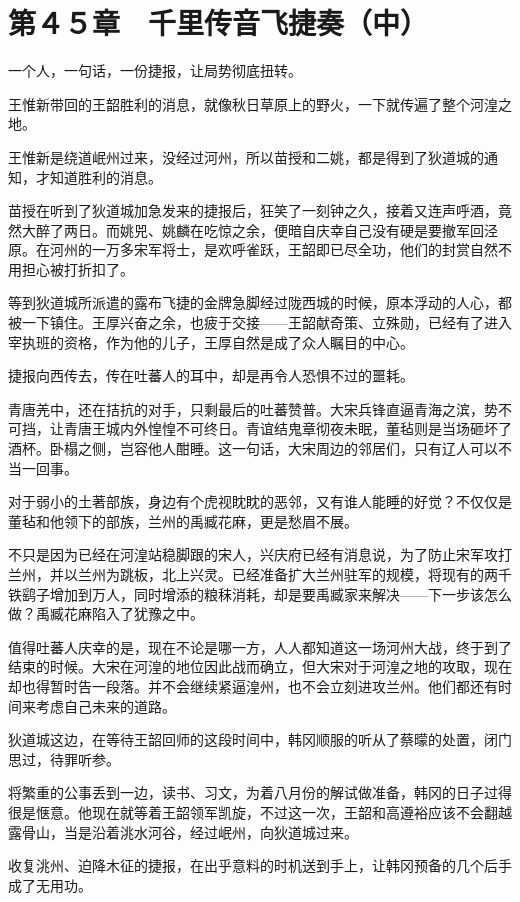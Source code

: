 \section{第４５章　千里传音飞捷奏（中）}

一个人，一句话，一份捷报，让局势彻底扭转。

王惟新带回的王韶胜利的消息，就像秋日草原上的野火，一下就传遍了整个河湟之地。

王惟新是绕道岷州过来，没经过河州，所以苗授和二姚，都是得到了狄道城的通知，才知道胜利的消息。

苗授在听到了狄道城加急发来的捷报后，狂笑了一刻钟之久，接着又连声呼酒，竟然大醉了两日。而姚兕、姚麟在吃惊之余，便暗自庆幸自己没有硬是要撤军回泾原。在河州的一万多宋军将士，是欢呼雀跃，王韶即已尽全功，他们的封赏自然不用担心被打折扣了。

等到狄道城所派遣的露布飞捷的金牌急脚经过陇西城的时候，原本浮动的人心，都被一下镇住。王厚兴奋之余，也疲于交接——王韶献奇策、立殊勋，已经有了进入宰执班的资格，作为他的儿子，王厚自然是成了众人瞩目的中心。

捷报向西传去，传在吐蕃人的耳中，却是再令人恐惧不过的噩耗。

青唐羌中，还在拮抗的对手，只剩最后的吐蕃赞普。大宋兵锋直逼青海之滨，势不可挡，让青唐王城内外惶惶不可终日。青谊结鬼章彻夜未眠，董毡则是当场砸坏了酒杯。卧榻之侧，岂容他人酣睡。这一句话，大宋周边的邻居们，只有辽人可以不当一回事。

对于弱小的土著部族，身边有个虎视眈眈的恶邻，又有谁人能睡的好觉？不仅仅是董毡和他领下的部族，兰州的禹臧花麻，更是愁眉不展。

不只是因为已经在河湟站稳脚跟的宋人，兴庆府已经有消息说，为了防止宋军攻打兰州，并以兰州为跳板，北上兴灵。已经准备扩大兰州驻军的规模，将现有的两千铁鹞子增加到万人，同时增添的粮秣消耗，却是要禹臧家来解决——下一步该怎么做？禹臧花麻陷入了犹豫之中。

值得吐蕃人庆幸的是，现在不论是哪一方，人人都知道这一场河州大战，终于到了结束的时候。大宋在河湟的地位因此战而确立，但大宋对于河湟之地的攻取，现在却也得暂时告一段落。并不会继续紧逼湟州，也不会立刻进攻兰州。他们都还有时间来考虑自己未来的道路。

狄道城这边，在等待王韶回师的这段时间中，韩冈顺服的听从了蔡曚的处置，闭门思过，待罪听参。

将繁重的公事丢到一边，读书、习文，为着八月份的解试做准备，韩冈的日子过得很是惬意。他现在就等着王韶领军凯旋，不过这一次，王韶和高遵裕应该不会翻越露骨山，当是沿着洮水河谷，经过岷州，向狄道城过来。

收复洮州、迫降木征的捷报，在出乎意料的时机送到手上，让韩冈预备的几个后手成了无用功。

